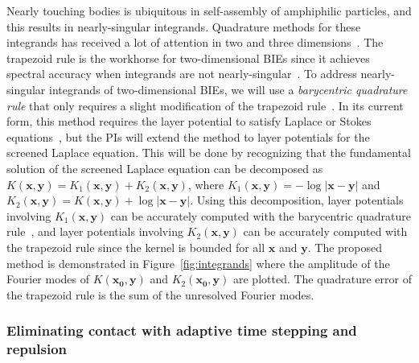 Nearly touching bodies is ubiquitous in self-assembly of amphiphilic
particles, and this results in nearly-singular integrands. Quadrature
methods for these integrands has received a lot of attention in two and
three dimensions~\cite{alpert, kapur, sidi, duffy, bruno1, bruno2,
davis_1984, graglia_2008, hackbusch_sauter_1994, jarvenpaa_2003,
khayat_2005, schwab_1992, ying_2006, beale1, beale2, goodman_1990,
haroldson_1998, lowengrub_1993, schwab_1992, ggq1, ggq2, ggq3,
helsing_2008a, helsing_integral_2009, helsing_tutorial_2012,
klockner2013jcp, qbx2, wala2019jcp, af2018sisc, siegel2018jcp,
rachh2017jcp, ding2019arxiv, bar2014}. The trapezoid rule is the
workhorse for two-dimensional BIEs since it achieves spectral accuracy
when integrands are not nearly-singular~\cite{tre-wei2014}. To address
nearly-singular integrands of two-dimensional BIEs, we will use a {\em
barycentric quadrature rule} that only requires a slight modification of
the trapezoid rule~\cite{ioa-pap-per1991}. In its current form, this
method requires the layer potential to satisfy Laplace or Stokes
equations~\cite{bar-wu-vee2015, chi-moo-qua2020}, but the PIs will extend
the method to layer potentials for the screened Laplace
equation. This will be done by recognizing that the fundamental solution
of the screened Laplace equation can be decomposed as
$K(\mathbf{x},\mathbf{y}) = K_1(\mathbf{x},\mathbf{y}) +
K_2(\mathbf{x},\mathbf{y})$, where $K_1(\mathbf{x},\mathbf{y}) =
-\log|\mathbf{x} - \mathbf{y}|$ and $K_2(\mathbf{x},\mathbf{y}) =
K(\mathbf{x},\mathbf{y}) + \log|\mathbf{x} - \mathbf{y}|$. Using this
decomposition, layer potentials involving $K_1(\mathbf{x},\mathbf{y})$
can be accurately computed with the barycentric quadrature
rule~\cite{ioa-pap-per1991}, and layer potentials involving
$K_2(\mathbf{x},\mathbf{y})$ can be accurately computed with the
trapezoid rule since the kernel is bounded for all $\mathbf{x}$ and
$\mathbf{y}$. The proposed method is demonstrated in
Figure~\ref{fig:integrands} where the amplitude of the Fourier modes of
$K(\mathbf{x_0},\mathbf{y})$ and $K_2(\mathbf{x_0},\mathbf{y})$ are
plotted. The quadrature error of the trapezoid rule is the sum of the
unresolved Fourier modes.


\subsubsection{Eliminating contact with adaptive time stepping and
repulsion}
\label{subsec:timeStepping}

